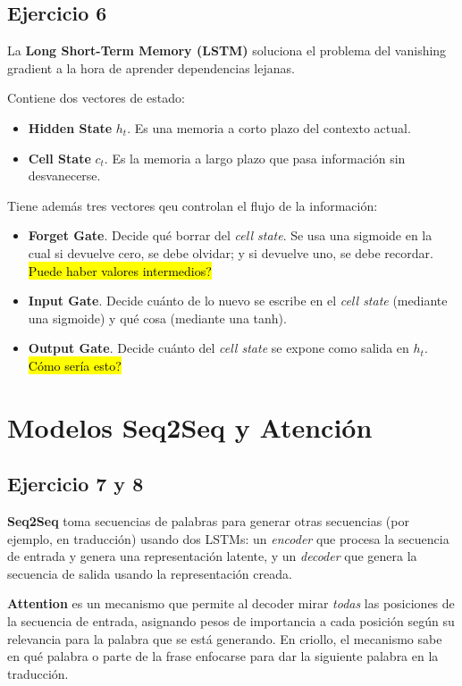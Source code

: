 \documentclass[a4paper,11pt]{article}
\begin{document}
\subsection*{Ejercicio 6}
La \textbf{Long Short-Term Memory (LSTM)} soluciona el problema del vanishing gradient a la hora de aprender dependencias lejanas.

Contiene dos vectores de estado:
\begin{itemize}
	\item \textbf{Hidden State} $h_{t}$. Es una memoria a corto plazo del contexto actual.
	\item \textbf{Cell State} $c_{t}$. Es la memoria a largo plazo que pasa información sin desvanecerse.
\end{itemize}

Tiene además tres vectores qeu controlan el flujo de la información:
\begin{itemize}
	\item \textbf{Forget Gate}. Decide qué borrar del \textit{cell state}. Se usa una sigmoide en la cual si devuelve cero, se debe olvidar; y si devuelve uno, se debe recordar. \hl{Puede haber valores intermedios?}
	\item \textbf{Input Gate}. Decide cuánto de lo nuevo se escribe en el \textit{cell state} (mediante una sigmoide) y qué cosa (mediante una tanh).
	\item \textbf{Output Gate}. Decide cuánto del \textit{cell state} se expone como salida en $h_{t}$. \hl{Cómo sería esto?}
\end{itemize}

\section*{Modelos Seq2Seq y Atención}
\subsection*{Ejercicio 7 y 8}
\textbf{Seq2Seq} toma secuencias de palabras para generar otras secuencias (por ejemplo, en traducción) usando dos LSTMs: un \emph{encoder} que procesa la secuencia de entrada y genera una representación latente, y un \emph{decoder} que genera la secuencia de salida usando la representación creada.

\textbf{Attention} es un mecanismo que permite al decoder mirar \emph{todas} las posiciones de la secuencia de entrada, asignando pesos de importancia a cada posición según su relevancia para la palabra que se está generando. En criollo, el mecanismo sabe en qué palabra o parte de la frase enfocarse para dar la siguiente palabra en la traducción.
\end{document}

